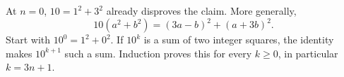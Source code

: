 At $n=0$, $10=1^2+3^2$ already disproves the claim. More generally,
\[
10(a^2+b^2)=(3a-b)^2+(a+3b)^2.
\]
Start with $10^0=1^2+0^2$. If $10^k$ is a sum of two integer squares, the identity makes $10^{k+1}$ such a sum. Induction proves this for every $k\ge0$, in particular $k=3n+1$.
